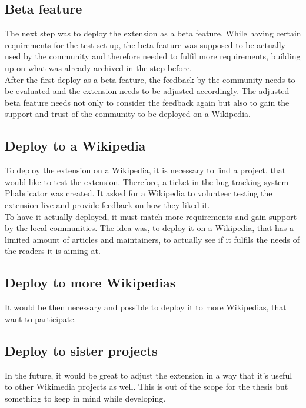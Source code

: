 \documentclass[11pt]{article}
\begin{document}
  \subsection{Beta feature}
  The next step was to deploy the extension as a beta feature. While having certain requirements for the test set up, the beta feature was supposed to be actually used by the community and therefore needed to fulfil more requirements, building up on what was already archived in the step before. \\
  After the first deploy as a beta feature, the feedback by the community needs to be evaluated and the extension needs to be adjusted accordingly. The adjusted beta feature needs not only to consider the feedback again but also to gain the support and trust of the community to be deployed on a Wikipedia.

  \subsection{Deploy to a Wikipedia}
  To deploy the extension on a Wikipedia, it is necessary to find a project, that would like to test the extension. Therefore, a ticket in the bug tracking system Phabricator was created. It asked for a Wikipedia to volunteer testing the extension live and provide feedback on how they liked it. \\
  To have it actually deployed, it must match more requirements and gain support by the local communities. The idea was, to deploy it on a Wikipedia, that has a limited amount of articles and maintainers, to actually see if it fulfils the needs of the readers it is aiming at. 

  \subsection{Deploy to more Wikipedias}
  It would be then necessary and possible to deploy it to more Wikipedias, that want to participate. 

  \subsection{Deploy to sister projects}
  In the future, it would be great to adjust the extension in a way that it's useful to other Wikimedia projects as well. This is out of the scope for the thesis but something to keep in mind while developing. 

 
\end{document}
